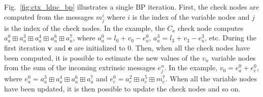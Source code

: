 Fig.~\ref{fig:ctx_ldpc_bp} illustrates a single BP iteration. First, the check
nodes are computed from the messages $m_j^i$ where $i$ is the index of the
variable nodes and $j$ is the index of the check nodes. In the example, the
$C_a$ check node computes $a^0_a \boxplus a^3_a \boxplus a^4_a \boxplus a^6_a
\boxplus a^7_a$, where $a^0_a = l_0 + v_0 - e^{0}_a$, $a^3_a = l_3 + v_3 -
e^{3}_a$, etc. During the first iteration $\bm{v}$ and $\bm{e}$ are initialized
to 0. Then, when all the check nodes have been computed, it is possible to
estimate the new values of the $v_n$ variable nodes from the sum of the
incoming extrinsic messages $e_j^n$. In the example, $v_0 = e^0_a + e^0_c$,
where $e^0_a = a^3_a \boxplus a^4_a \boxplus a^6_a \boxplus a^7_a$ and $e^0_c =
a^2_c \boxplus a^5_c \boxplus m^7_c$. When all the variable nodes have been
updated, it is then possible to update the check nodes and so on.



